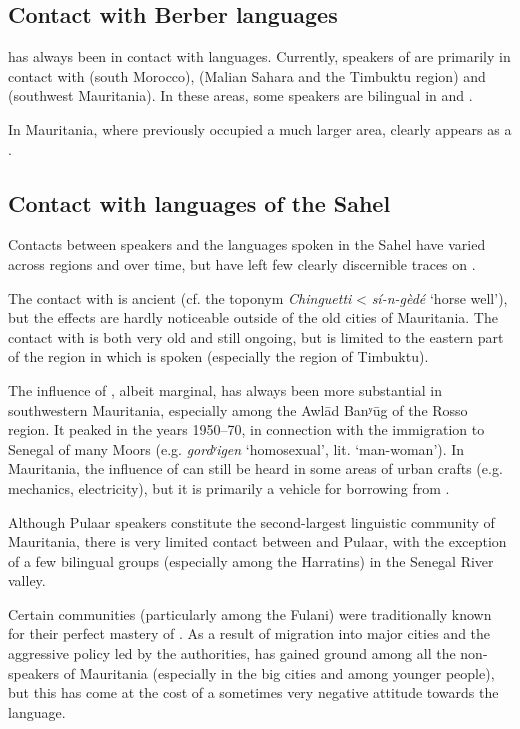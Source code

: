 \documentclass[output=paper]{langsci/langscibook}
\begin{document}
\subsection{Contact with Berber languages} %

 has always been in contact with  languages. Currently, speakers of  are primarily in contact with  (south Morocco),  (Malian Sahara and the Timbuktu region) and  (southwest Mauritania). In these areas, some speakers are bilingual in  and . 

In Mauritania, where  previously occupied a much larger area,  clearly appears as a .

\subsection{Contact with languages of the Sahel} %

Contacts between  speakers and the languages spoken in the Sahel have varied across regions and over time, but have left few clearly discernible traces on .

The contact with  is ancient (cf. the toponym \textit{Chinguetti} <  \textit{sí-n-gèdé} ‘horse well’), but the effects are hardly noticeable outside of the old cities of Mauritania. The contact with  is both very old and still ongoing, but is limited to the eastern part of the region in which  is spoken (especially the region of Timbuktu).

The influence of , albeit marginal, has always been more substantial in southwestern Mauritania, especially among the Awlād Banʸūg of the Rosso region. It peaked in the years 1950–70, in connection with the immigration to Senegal of many Moors (e.g. \textit{gordʸigen} ‘homosexual’, lit. ‘man-woman’). In Mauritania, the influence of  can still be heard in some areas of urban crafts (e.g. mechanics, electricity), but it is primarily a vehicle for borrowing from .

Although Pulaar speakers constitute the second-largest linguistic community of Mauritania, there is very limited contact between  and Pulaar, with the exception of a few bilingual groups (especially among the Harratins) in the Senegal River valley.

Certain communities (particularly among the Fulani) were traditionally known for their perfect mastery of . As a result of migration into major cities and the aggressive  policy led by the authorities,  has gained ground among all the non- speakers of Mauritania (especially in the big cities and among younger people), but this has come at the cost of a sometimes very negative attitude towards the language. 
\end{document}
